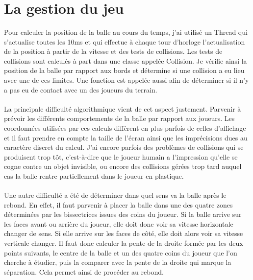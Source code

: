 \documentclass[a4paper,12pt]{report}
\begin{document}
\section{La gestion du jeu}
\paragraph{}
Pour calculer la position de la balle au cours du temps, j'ai utilisé un Thread qui s'actualise toutes les 10ms et qui effectue à chaque tour d'horloge
l'actualisation de la position à partir de la vitesse et des tests de collisions. Les tests de collisions sont calculés à part dans une classe appelée Collision.
Je vérifie ainsi la position de la balle par rapport aux bords et détermine si une collision a eu lieu avec une de ces limites. Une fonction est appelée aussi afin de
déterminer si il n'y a pas eu de contact avec un des joueurs du terrain.
\paragraph{}
La principale difficulté algorithmique vient de cet aspect justement. Parvenir à prévoir les différents comportements de la balle par rapport aux
joueurs. Les coordonnées utilisées par ces calculs diffèrent en plus parfois de celles d'affichage et il faut prendre en compte la taille de l'écran ainsi que les imprécisions dues au caractère discret du calcul. J'ai encore parfois des problèmes de collisions qui se produisent trop tôt, c'est-à-dire que le joueur humain a l'impression qu'elle se cogne contre un objet invisible, ou encore des collisions gérées trop tard auquel cas la balle rentre partiellement dans le joueur en plastique.
\paragraph{}
Une autre difficulté a été de déterminer dans quel sens va la balle après le rebond. En effet, il faut parvenir à placer la balle dans une des quatre zones déterminées par les bissectrices issues des coins du joueur. Si la balle arrive sur les faces avant ou arrière du joueur, elle doit donc voir sa vitesse horizontale changer de sens. Si elle arrive sur les faces de côté, elle doit alors voir sa vitesse verticale changer. Il faut donc calculer la pente de la droite formée par les deux points suivants, le centre de la balle et un des quatre coins du joueur que l'on cherche à étudier, puis la comparer avec la pente de la droite qui marque la séparation. Cela permet ainsi de procéder au rebond.
\end{document}
